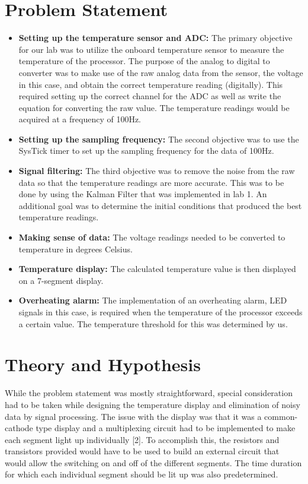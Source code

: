 \documentclass{article}
\begin{document}
\section{Problem Statement}
\begin{itemize}
\item \textbf{Setting up the temperature sensor and ADC:} The primary objective for our lab was to utilize the onboard temperature sensor to measure the temperature of the processor. The purpose of the analog to digital to converter was to make use of the raw analog data from the sensor, the voltage in this case, and obtain the correct temperature reading (digitally). This required setting up the correct channel for the ADC as well as write the equation for converting the raw value. The temperature readings would be acquired at a frequency of 100Hz.
\item \textbf{Setting up the sampling frequency:} The second objective was to use the SysTick timer to set up the sampling frequency for the data of 100Hz.
\item \textbf{Signal filtering:} The third objective was to remove the noise from the raw data so that the temperature readings are more accurate. This was to be done by using the Kalman Filter that was implemented in lab 1. An additional goal was to determine the initial conditions that produced the best temperature readings.
\item \textbf{Making sense of data:} The voltage readings needed to be converted to temperature in degrees Celsius.
\item \textbf{Temperature display:} The calculated temperature value is then displayed on a 7-segment display.
\item \textbf{Overheating alarm:} The implementation of an overheating alarm, LED signals in this case, is required when the temperature of the processor exceeds a certain value. The temperature threshold for this was determined by us.
\end{itemize}

\section{Theory and Hypothesis}
While the problem statement was mostly straightforward, special consideration had to be taken while designing the temperature display and elimination of noisy data by signal processing. The issue with the display was that it was a common-cathode type display and a multiplexing circuit had to be implemented to make each segment light up individually [2]. To accomplish this, the resistors and transistors provided would have to be used to build an external circuit that would allow the switching on and off of the different segments. The time duration for which each individual segment should be lit up was also predetermined.\\
\end{document}
